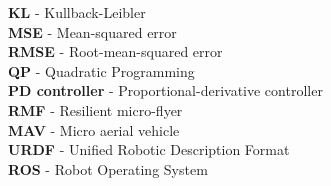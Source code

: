 \noindent
\textbf{KL} - Kullback-Leibler \\[-4mm]

\noindent
\textbf{MSE} - Mean-squared error \\[-4mm]

\noindent
\textbf{RMSE} - Root-mean-squared error \\[-4mm]

\noindent
\textbf{QP} - Quadratic Programming \\[-4mm]

\noindent
\textbf{PD controller} - Proportional-derivative controller \\[-4mm]

\noindent
\textbf{RMF} - Resilient micro-flyer \\[-4mm]

\noindent
\textbf{MAV} - Micro aerial vehicle \\[-4mm]

\noindent
\textbf{URDF} -  Unified Robotic Description Format \\[-4mm]

\noindent
\textbf{ROS} - Robot Operating System \\[-4mm]



